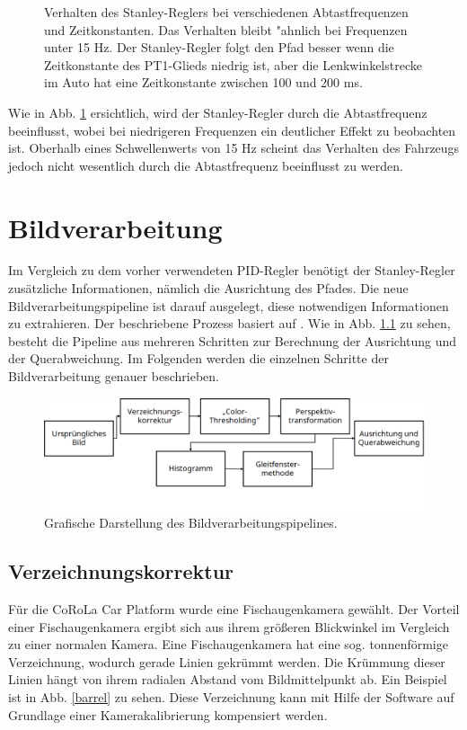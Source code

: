 \documentclass[arbeit=studie,oneside,BCOR=12mm]{ArbeitRST}
\begin{document}
\begin{figure}[h]
    \caption{Verhalten des Stanley-Reglers bei verschiedenen Abtastfrequenzen und Zeitkonstanten.
    Das Verhalten bleibt "ahnlich bei Frequenzen unter 15 Hz. Der Stanley-Regler folgt den Pfad besser
    wenn die Zeitkonstante des PT1-Glieds niedrig ist, aber die Lenkwinkelstrecke im Auto hat eine 
    Zeitkonstante zwischen 100 und 200 ms.}
    \label{sampling}
\end{figure}

Wie in Abb. \ref{sampling} ersichtlich, wird der Stanley-Regler durch die Abtastfrequenz
beeinflusst, wobei bei niedrigeren Frequenzen ein deutlicher Effekt zu
beobachten ist. Oberhalb eines Schwellenwerts von 15 Hz scheint das
Verhalten des Fahrzeugs jedoch nicht wesentlich durch die Abtastfrequenz
beeinflusst zu werden. 


\chapter{Bildverarbeitung}

Im Vergleich zu dem vorher verwendeten PID-Regler benötigt der
Stanley-Regler zusätzliche Informationen, nämlich die Ausrichtung des Pfades.
Die neue Bildverarbeitungspipeline ist darauf ausgelegt, diese notwendigen
Informationen zu extrahieren. Der beschriebene Prozess basiert auf \cite{addison-pipeline}. Wie in Abb. \ref{pipeline} zu sehen, besteht die
Pipeline aus mehreren Schritten zur Berechnung der Ausrichtung und der
Querabweichung. Im Folgenden werden die einzelnen Schritte der Bildverarbeitung
genauer beschrieben. \\

\begin{figure}[h]
    \centering
    \includegraphics[scale=0.72]{pipeline}
    \caption{Grafische Darstellung des Bildverarbeitungspipelines.}
    \label{pipeline}
\end{figure}


\section{Verzeichnungskorrektur}
Für die CoRoLa
Car Platform wurde eine Fischaugenkamera gewählt. Der Vorteil einer
Fischaugenkamera ergibt sich aus ihrem größeren Blickwinkel im Vergleich zu
einer normalen Kamera. Eine Fischaugenkamera hat eine sog. \glqq
tonnenförmige Verzeichnung\grqq \cite{wiki-verzei}, wodurch gerade Linien
gekrümmt werden. Die Krümmung dieser Linien hängt von ihrem radialen Abstand
vom Bildmittelpunkt ab. Ein Beispiel ist in Abb. \ref{barrel} zu sehen. Diese
Verzeichnung kann mit Hilfe der Software \cite{opencv} auf Grundlage einer 
Kamerakalibrierung kompensiert werden.
\end{document}
